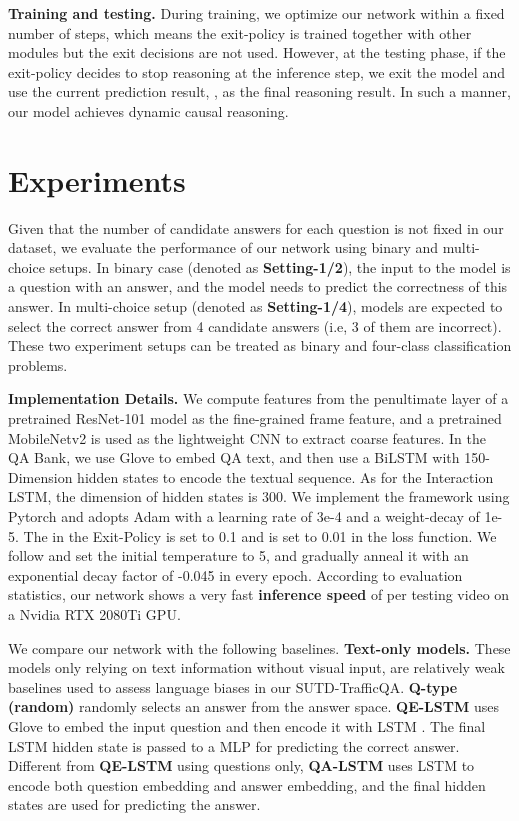 \documentclass[final]{cvpr}
\begin{document}
{\bf Training and testing.} During training, we optimize our network within a fixed number of steps, which means the exit-policy is trained together with other modules but the exit decisions 
are not used. However, at the testing phase, if the exit-policy decides to stop reasoning at the  inference step, we exit the model and use the current prediction result, , as the final reasoning result. In such a manner, our model achieves dynamic causal reasoning.

\section{Experiments} \label{sec:exp}
Given that the number of candidate answers for each question is not fixed in our dataset, we evaluate the performance of our network using binary and multi-choice setups. In binary case (denoted as \textbf{Setting-1/2}), the input to the model is a question with an answer, and the model needs to predict the correctness of this answer. In multi-choice setup (denoted as \textbf{Setting-1/4}), models are expected to select the correct answer from 4 candidate answers (i.e, 3 of them are incorrect). These two experiment setups can be treated as binary and four-class classification problems.

{\bf Implementation Details.} 
We compute features from the penultimate layer of a pretrained ResNet-101 model \cite{he2016deep} as the fine-grained frame feature,
and a pretrained MobileNetv2 \cite{sandler2018mobilenetv2} is used as the lightweight CNN to extract coarse features. In the QA Bank, we use Glove \cite{Pennington14glove:global} to embed QA text, and then use a BiLSTM with 150-Dimension hidden states to encode the textual sequence.  As for the Interaction LSTM, the dimension of hidden states is 300.
We implement the framework using Pytorch and adopts Adam \cite{kingma2014adam} with a learning rate of 3e-4 and a weight-decay of 1e-5. The  in the Exit-Policy is set to 0.1 and  is set to 0.01 in the loss function. We follow \cite{jang2016categorical} and set the initial temperature  to 5, and gradually anneal it with an exponential decay factor of -0.045 in every epoch. According to evaluation statistics, our network shows a very fast \textbf{inference speed} of  per testing video on a Nvidia RTX 2080Ti GPU.

We compare our network with the following baselines.
{\bf Text-only models.} These models only relying on text information without visual input, are relatively weak baselines used to assess language biases in our SUTD-TrafficQA. {\bf Q-type (random)} randomly selects an answer from the answer space. {\bf QE-LSTM} uses Glove \cite{Pennington14glove:global} to embed the input question and then encode it with LSTM \cite{hochreiter1997long}. The final LSTM hidden state is passed to a MLP for predicting the correct answer. Different from {\bf QE-LSTM} using questions only, {\bf QA-LSTM} uses LSTM to encode both question embedding and answer embedding, and the final hidden states are used for predicting the answer.
\end{document}
